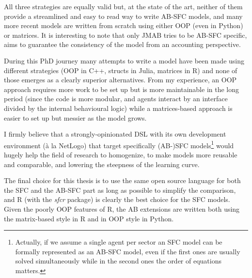 All three strategies are equally valid but, at the state of the art, neither of them provide a streamlined and easy to read way to write AB-SFC models, and many more recent models are written from scratch using either OOP (even in Python) or matrices. It is interesting to note that only JMAB tries to be AB-SFC specific, aims to guarantee the consistency of the model from an accounting perspective.

During this PhD journey many attempts to write a model have been made using different strategies (OOP in C++, structs in Julia, matrices in R) and none of those emerges as a clearly superior alternatives. From my experience, an OOP approach requires more work to be set up but is more maintainable in the long period (since the code is more modular, and agents interact by an interface divided by the internal behavioural logic) while a matrices-based approach is easier to set up but messier as the model grows.

I firmly believe that a strongly-opinionated DSL with its own development environment (à la NetLogo) that target specifically (AB-)SFC models\footnote{Actually, if we assume a single agent per sector an SFC model can be formally represented as an AB-SFC model, even if the first ones are usually solved simultaneously while in the second ones the order of equations matters.} would hugely help the field of research to homogenize, to make models more reusable and comparable, and lowering the steepness of the learning curve.

The final choice for this thesis is to use the same open source language for both the SFC and the AB-SFC part as long as possible to simplify the comparison, and R (with the \textit{sfcr} package) is clearly the best choice for the SFC models. Given the poorly OOP features of R, the AB extensions are written both using the matrix-based style in R and in OOP style in Python.